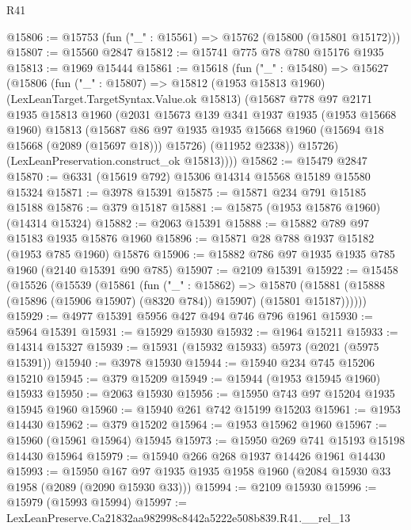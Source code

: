 \begin{lexlean}{R41}
\begin{coremodule}
@15806 := @15753 (fun ("_" : @15561) => @15762 (@15800 (@15801 @15172)))
@15807 := @15560 @2847
@15812 := @15741 @775 @78 @780 @15176 @1935
@15813 := @1969 @15444
@15861 := @15618
    (fun ("_" : @15480) =>
    @15627
      (@15806
        (fun ("_" : @15807) =>
        @15812
          (@1953 @15813 @1960)
          (LexLeanTarget.TargetSyntax.Value.ok @15813)
          (@15687
            @778
            @97
            @2171
            @1935
            @15813
            @1960
            (@2031
              @15673
              @139
              @341
              @1937
              @1935
              (@1953 @15668 @1960)
              @15813
              (@15687
                @86
                @97
                @1935
                @1935
                @15668
                @1960
                (@15694 @18 @15668 (@2089 (@15697 @18)))
                @15726)
              (@11952 @2338))
            @15726)
          (LexLeanPreservation.construct_ok @15813))))
@15862 := @15479 @2847
@15870 := @6331 (@15619 @792) @15306 @14314 @15568 @15189 @15580 @15324
@15871 := @3978 @15391
@15875 := @15871 @234 @791 @15185 @15188
@15876 := @379 @15187
@15881 := @15875 (@1953 @15876 @1960) (@14314 @15324)
@15882 := @2063 @15391
@15888 := @15882 @789 @97 @15183 @1935 @15876 @1960
@15896 := @15871 @28 @788 @1937 @15182 (@1953 @785 @1960) @15876
@15906 := @15882 @786 @97 @1935 @1935 @785 @1960 (@2140 @15391 @90 @785)
@15907 := @2109 @15391
@15922 := @15458
    (@15526
      (@15539
        (@15861
          (fun ("_" : @15862) =>
          @15870 (@15881 (@15888 (@15896 (@15906 @15907) (@8320 @784)) @15907) (@15801 @15187))))))
@15929 := @4977 @15391 @5956 @427 @494 @746 @796 @1961
@15930 := @5964 @15391
@15931 := @15929 @15930
@15932 := @1964 @15211
@15933 := @14314 @15327
@15939 := @15931 (@15932 @15933) @5973 (@2021 (@5975 @15391))
@15940 := @3978 @15930
@15944 := @15940 @234 @745 @15206 @15210
@15945 := @379 @15209
@15949 := @15944 (@1953 @15945 @1960) @15933
@15950 := @2063 @15930
@15956 := @15950 @743 @97 @15204 @1935 @15945 @1960
@15960 := @15940 @261 @742 @15199 @15203
@15961 := @1953 @14430
@15962 := @379 @15202
@15964 := @1953 @15962 @1960
@15967 := @15960 (@15961 @15964) @15945
@15973 := @15950 @269 @741 @15193 @15198 @14430 @15964
@15979 := @15940 @266 @268 @1937 @14426 @1961 @14430
@15993 := @15950
    @167
    @97
    @1935
    @1935
    @1958
    @1960
    (@2084 @15930 @33 @1958 (@2089 (@2090 @15930 @33)))
@15994 := @2109 @15930
@15996 := @15979 (@15993 @15994)
@15997 := LexLeanPreserve.Ca21832aa982998c8442a5222e508b839.R41.__rel_13

\end{coremodule}
\end{lexlean}
